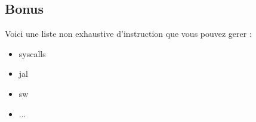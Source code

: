 \subsection{Bonus}

Voici une liste non exhaustive d'instruction que vous pouvez gerer :
\begin{itemize}
	\item syscalls
    \item jal
    \item sw
    \item ...
\end{itemize}